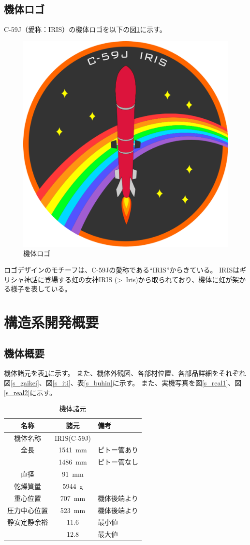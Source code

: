 \documentclass[a4paper,11pt,uplatex]{jsarticle}
\begin{document}
\subsection{機体ロゴ}
C-59J（愛称：IRIS）の機体ロゴを以下の図\ref{fig:sum_kitairogo}に示す。
\begin{figure}[H]
	\centering
	\includegraphics[width=0.5\linewidth]{pic_summary/newlogo.png}
	\caption{機体ロゴ}
	\label{fig:sum_kitairogo}
\end{figure}
ロゴデザインのモチーフは、C-59Jの愛称である``IRIS''からきている。
IRISはギリシャ神話に登場する虹の女神IRIS (\foreignlanguage{greek}{{>~I}ris})から取られており、機体に虹が架かる様子を表している。

\newpage
\section{構造系開発概要}
\subsection{機体概要}
機体諸元を表\ref{s_59syogen}に示す。
また、機体外観図、各部材位置、各部品詳細をそれぞれ図\ref{s_gaikei}、図\ref{s_iti}、表\ref{s_buhin}に示す。
また、実機写真を図\ref{s_real1}、図\ref{s_real2}に示す。

\begin{table}[H]
	\centering
	\caption{機体諸元}
	\begin{tabular}{ccl} \toprule
		名称     & 諸元            & 備考     \\\midrule
		機体名称   & IRIS(C-59J)            \\
		全長     & \SI{1541}{mm} & ピトー管あり \\
		       & \SI{1486}{mm} & ピトー管なし \\
		直径     & \SI{91}{mm}            \\
		乾燥質量   & \SI{5944}{g}           \\
		重心位置   & \SI{707}{mm}  & 機体後端より \\
		圧力中心位置 & \SI{523}{mm}  & 機体後端より \\
		静安定静余裕 & 11.6          & 最小値    \\
		       & 12.8          & 最大値    \\
		\bottomrule
	\end{tabular}
	\label{s_59syogen}
\end{table}
\end{document}
